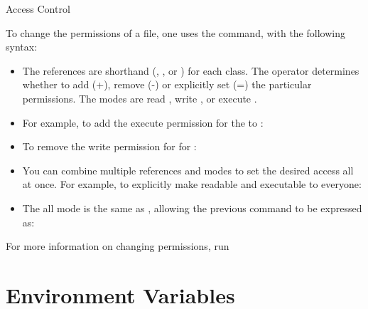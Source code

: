 \documentclass{setbeamer}
\begin{document}
\begin{frame}{Access Control}

To change the permissions of a file, one uses the  command, with the following syntax:
\begin{itemize}


\item
{}
The references are shorthand (, , or ) for each class. The operator determines whether to add (+), remove (-) or explicitly set (=) the particular permissions. The modes are read , write , or execute .
\item
For example, to add the execute permission for the  to :\\
\item
To remove the write permission for  for :

\item
You can combine multiple references and modes to set the desired access all at once. For example, to explicitly make  readable and executable to everyone:\\

\item
The all  mode is the same as , allowing the previous command to be expressed as:

\end{itemize}
For more information on changing permissions, run 

\end{frame}



\section{Environment Variables}
\end{document}
